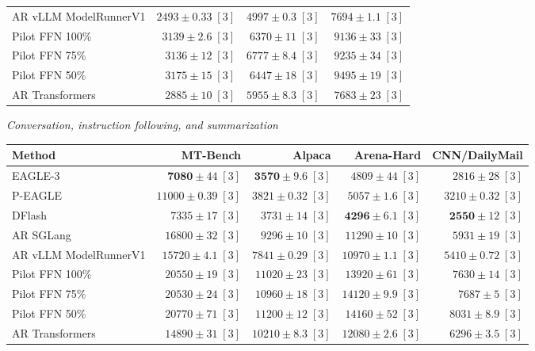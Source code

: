 \documentclass[conference,onecolumn]{IEEEtran}
\begin{document}
\begin{table}[!htp]
\begin{tabular}{@{}>{\raggedright\arraybackslash}p{3.7cm}rrr@{}}
AR \textperiodcentered{} vLLM ModelRunnerV1 & \(2493 \pm 0.33\;[3]\) & \(4997 \pm 0.3\;[3]\) & \(7694 \pm 1.1\;[3]\) \\
Pilot FFN 100\% & \(3139 \pm 2.6\;[3]\) & \(6370 \pm 11\;[3]\) & \(9136 \pm 33\;[3]\) \\
Pilot FFN 75\% & \(3136 \pm 12\;[3]\) & \(6777 \pm 8.4\;[3]\) & \(9235 \pm 34\;[3]\) \\
Pilot FFN 50\% & \(3175 \pm 15\;[3]\) & \(6447 \pm 18\;[3]\) & \(9495 \pm 19\;[3]\) \\
AR \textperiodcentered{} Transformers & \(2885 \pm 10\;[3]\) & \(5955 \pm 8.3\;[3]\) & \(7683 \pm 23\;[3]\) \\
\bottomrule
\end{tabular}\par\medskip
\textit{Conversation, instruction following, and summarization}\par\smallskip
\begin{tabular}{@{}>{\raggedright\arraybackslash}p{3.7cm}rrrr@{}}
\toprule
Method & MT-Bench & Alpaca & Arena-Hard & CNN/DailyMail \\
\midrule
EAGLE-3 & \(\mathbf{7080} \pm 44\;[3]\) & \(\mathbf{3570} \pm 9.6\;[3]\) & \(4809 \pm 44\;[3]\) & \(2816 \pm 28\;[3]\) \\
P-EAGLE & \(11000 \pm 0.39\;[3]\) & \(3821 \pm 0.32\;[3]\) & \(5057 \pm 1.6\;[3]\) & \(3210 \pm 0.32\;[3]\) \\
DFlash & \(7335 \pm 17\;[3]\) & \(3731 \pm 14\;[3]\) & \(\mathbf{4296} \pm 6.1\;[3]\) & \(\mathbf{2550} \pm 12\;[3]\) \\
AR \textperiodcentered{} SGLang & \(16800 \pm 32\;[3]\) & \(9296 \pm 10\;[3]\) & \(11290 \pm 10\;[3]\) & \(5931 \pm 19\;[3]\) \\
AR \textperiodcentered{} vLLM ModelRunnerV1 & \(15720 \pm 4.1\;[3]\) & \(7841 \pm 0.29\;[3]\) & \(10970 \pm 1.1\;[3]\) & \(5410 \pm 0.72\;[3]\) \\
Pilot FFN 100\% & \(20550 \pm 19\;[3]\) & \(11020 \pm 23\;[3]\) & \(13920 \pm 61\;[3]\) & \(7630 \pm 14\;[3]\) \\
Pilot FFN 75\% & \(20530 \pm 24\;[3]\) & \(10960 \pm 18\;[3]\) & \(14120 \pm 9.9\;[3]\) & \(7687 \pm 5\;[3]\) \\
Pilot FFN 50\% & \(20770 \pm 71\;[3]\) & \(11200 \pm 12\;[3]\) & \(14160 \pm 52\;[3]\) & \(8031 \pm 8.9\;[3]\) \\
AR \textperiodcentered{} Transformers & \(14890 \pm 31\;[3]\) & \(10210 \pm 8.3\;[3]\) & \(12080 \pm 2.6\;[3]\) & \(6296 \pm 3.5\;[3]\) \\

\end{tabular}
\end{table}
\end{document}
